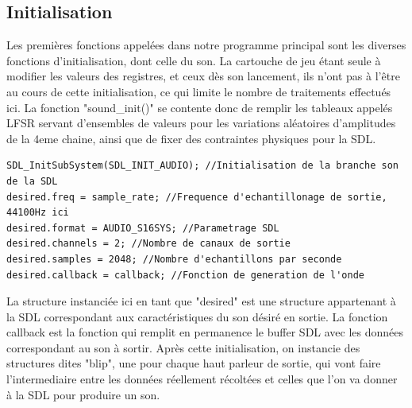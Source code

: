 \documentclass[french]{report}
\begin{document}
\subsection{Initialisation}
Les premières fonctions appelées dans notre programme principal sont les diverses fonctions d'initialisation, dont celle du son.
La cartouche de jeu étant seule à modifier les valeurs des registres, et ceux dès son lancement, ils n'ont pas à l'être au cours de cette initialisation, ce qui limite le nombre de traitements effectués ici.
La fonction "sound\_init()" se contente donc de remplir les tableaux appelés LFSR servant d'ensembles de valeurs pour les variations aléatoires d'amplitudes de la 4eme chaine, ainsi que de fixer des contraintes physiques pour la SDL.
\begin{lstlisting}
SDL_InitSubSystem(SDL_INIT_AUDIO); //Initialisation de la branche son de la SDL
desired.freq = sample_rate; //Frequence d'echantillonage de sortie, 44100Hz ici
desired.format = AUDIO_S16SYS; //Parametrage SDL
desired.channels = 2; //Nombre de canaux de sortie
desired.samples = 2048; //Nombre d'echantillons par seconde
desired.callback = callback; //Fonction de generation de l'onde
\end{lstlisting}
La structure instanciée ici en tant que "desired" est une structure appartenant à la SDL correspondant aux caractéristiques du son désiré en sortie.
La fonction callback est la fonction qui remplit en permanence le buffer SDL avec les données correspondant au son à sortir.
Après cette initialisation, on instancie des structures dites "blip", une pour chaque haut parleur de sortie, qui vont faire l'intermediaire entre les données réellement récoltées et celles que l'on va donner à la SDL pour produire un son.
\end{document}
